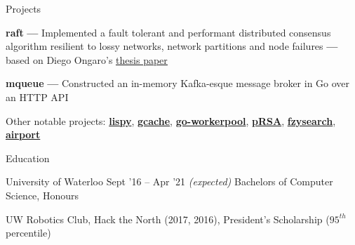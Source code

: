 \documentclass{resume} %
\begin{document}
\begin{rSection}{Projects}
  
  \begin{rProjectSection}
    \item \textbf {raft} {\textbf{---}} Implemented a fault tolerant and performant distributed
      consensus algorithm resilient to lossy networks, network partitions and
      node failures {\textbf{---}} based on Diego Ongaro's
      \href{https://raft.github.io/raft.pdf}{\underline{thesis paper}}
    \item \textbf {mqueue} {\textbf{---}} Constructed an in-memory Kafka-esque message broker in Go
      over an HTTP API
  \end{rProjectSection}

  \begin{rBlurbSection}
    \item {Other notable projects:}
      \href{https://github.com/ridwanmsharif/lispy}{\textbf{lispy}},
      \href{https://github.com/ridwanmsharif/cache}{\textbf{gcache}},
      \href{https://github.com/ridwanmsharif/goworkerpool}{\textbf{go-workerpool}},
      \href{https://github.com/ridwanmsharif/prsa}{\textbf{pRSA}},
      \href{https://github.com/ridwanmsharif/fzysearch}{\textbf{fzysearch}},
      \href{https://github.com/ridwanmsharif/airport}{\textbf{airport}}
  \end{rBlurbSection} 
 
\end{rSection}


\begin{rSection}{Education}
  \begin{rSubsection}{University of Waterloo}
		     {Sept '16 -- Apr '21 \em (expected)}
		     {Bachelors of Computer Science, Honours}
		     {}
    \item UW Robotics Club, Hack the North (2017, 2016), President's Scholarship
      ($95^{th}$ percentile)
  \end{rSubsection}
\end{rSection} 
\end{document}
